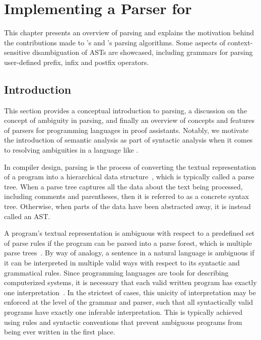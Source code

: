 \chapter{Implementing a Parser for \Beluga}\label{chapter:parsing-reimplementation}

This chapter presents an overview of parsing and explains the motivation behind the contributions made to \Beluga's and \Harpoon's parsing algorithms.
Some aspects of context-sensitive disambiguation of \acp{AST} are showcased, including grammars for parsing user-defined prefix, infix and postfix operators.

\section{Introduction}\label{section:parser-introduction}

This section provides a conceptual introduction to parsing, a discussion on the concept of ambiguity in parsing, and finally an overview of concepts and features of parsers for programming languages in proof assistants.
Notably, we motivate the introduction of semantic analysis as part of syntactic analysis when it comes to resolving ambiguities in a language like \Beluga.


In compiler design, parsing is the process of converting the textual representation of a program into a hierarchical data structure~\cite{aho2007compilers, afroozeh2019practical}, which is typically called a parse tree.
When a parse tree captures all the data about the text being processed, including comments and parentheses, then it is referred to as a concrete syntax tree.
Otherwise, when parts of the data have been abstracted away, it is instead called an \ac{AST}.


A program's textual representation is ambiguous with respect to a predefined set of parse rules if the program can be parsed into a parse forest, which is multiple parse trees~\cite{aho2007compilers}.
By way of analogy, a sentence in a natural language is ambiguous if it can be interpreted in multiple valid ways with respect to its syntactic and grammatical rules.
Since programming languages are tools for describing computerized systems, it is necessary that each valid written program has exactly one interpretation~\cite{aho2007compilers}.
In the strictest of cases, this unicity of interpretation may be enforced at the level of the grammar and parser, such that all syntactically valid programs have exactly one inferable interpretation.
This is typically achieved using rules and syntactic conventions that prevent ambiguous programs from being ever written in the first place.

